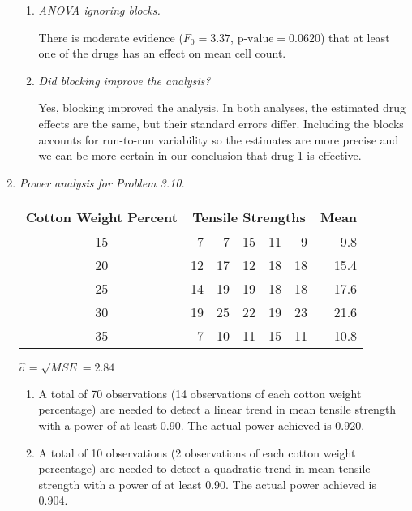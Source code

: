 \documentclass[11pt]{article}
\begin{document}
\begin{enumerate}
\begin{enumerate}
\item %
\emph{ANOVA ignoring blocks.}

There is moderate evidence (\(F_0=3.37\), \(\text{p-value}=0.0620\)) that at
least one of the drugs has an effect on mean cell count.

{\footnotesize}

\item %
\emph{Did blocking improve the analysis?}

Yes, blocking improved the analysis. In both analyses, the estimated drug
effects are the same, but their standard errors differ. Including the
blocks accounts for run-to-run variability so the estimates are more precise
and we can be more certain in our conclusion that drug 1 is effective.

\end{enumerate}

\item %
\emph{Power analysis for Problem 3.10.}

\begin{center}\begin{tabular}{c|rrrrr|r}
Cotton Weight Percent & \multicolumn{5}{c|}{Tensile Strengths} & Mean \\
\hline
15 &  7 &  7 & 15 & 11 &  9 &  9.8 \\
20 & 12 & 17 & 12 & 18 & 18 & 15.4 \\
25 & 14 & 19 & 19 & 18 & 18 & 17.6 \\
30 & 19 & 25 & 22 & 19 & 23 & 21.6 \\
35 &  7 & 10 & 11 & 15 & 11 & 10.8
\end{tabular}

\(\widehat\sigma=\sqrt{MSE}=2.84\)
\end{center}

\begin{enumerate}

\item %

A total of 70 observations (14 observations of each cotton weight percentage)
are needed to detect a linear trend in mean tensile strength with a power of
at least 0.90. The actual power achieved is 0.920.

\item %

A total of 10 observations (2 observations of each cotton weight percentage)
are needed to detect a quadratic trend in mean tensile strength with a power
of at least 0.90. The actual power achieved is 0.904.

\end{enumerate}

{\footnotesize}

\end{enumerate}
\end{document}

